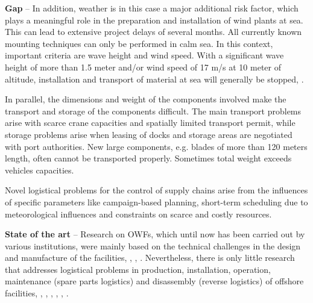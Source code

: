 \textbf{Gap} --
In addition, weather is in this case a major additional risk factor, which plays a meaningful role in the preparation and installation of wind plants at sea. This can lead to extensive project delays of several months. All currently known mounting techniques can only be performed in calm sea. In this context, important criteria are wave height and wind speed. With a significant wave height of more than 1.5 meter and/or wind speed of 17 m/s at 10 meter of altitude, installation and transport of material at sea will generally be stopped, \cite{aitsimulation}.

In parallel, the dimensions and weight of the components involved make the transport and storage of the components difficult. The main transport problems arise with scarce crane capacities and spatially limited transport permit, while storage problems arise when leasing of docks and storage areas are negotiated with port authorities. New large components, e.g. blades of more than 120 meters length, often cannot be transported properly. Sometimes total weight exceeds vehicles capacities.

Novel logistical problems for the control of supply chains arise from the influences of specific parameters like campaign-based planning, short-term scheduling due to meteorological influences and constraints on scarce and costly resources.

\textbf{State of the art} --
Research on OWFs, which until now has been carried out by various institutions, were mainly based on the technical challenges in the design and manufacture of the facilities, \cite{Miller2013}, \cite{SerranoGonzalez2014}, \cite{Perveen2014}. Nevertheless, there is only little research that addresses logistical problems in production, installation, operation, maintenance (spare parts logistics) and disassembly (reverse logistics) of offshore facilities, \cite{Scholz2010}, \cite{Lange2012}, \cite{COMPIT11}, \cite{COMPIT12}, \cite{aitsimulation}, \cite{thalji2012}.

